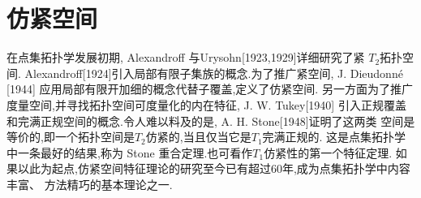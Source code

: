 \section{仿紧空间}\label{ch2.3}
在点集拓扑学发展初期, Alexandroff 与Urysohn[1923,1929]详细研究了紧
$T_2$拓扑空间. Alexandroff[1924]引入局部有限子集族的概念.为了推广紧空间, 
J. Dieudonn\'e [1944] 应用局部有限开加细的概念代替子覆盖,定义了仿紧空间.
另一方面为了推广度量空间,并寻找拓扑空间可度量化的内在特征, J. W. Tukey[1940]
引入正规覆盖和完满正规空间的概念.令人难以料及的是, A. H. Stone[1948]证明了这两类
空间是等价的,即一个拓扑空间是$T_2$仿紧的,当且仅当它是$T_1$完满正规的.
这是点集拓扑学中一条最好的结果,称为 Stone 重合定理.也可看作$T_1$仿紧性的第一个特征定理.
如果以此为起点,仿紧空间特征理论的研究至今已有超过60年,成为点集拓扑学中内容丰富、
方法精巧的基本理论之一.
